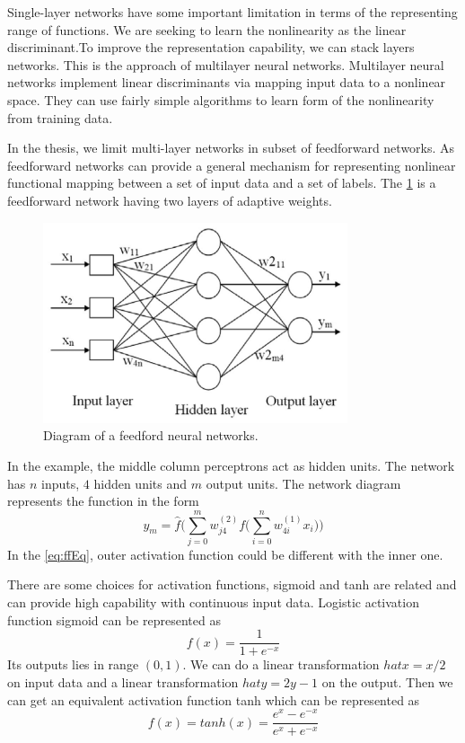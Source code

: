 Single-layer networks have some important limitation in terms of the representing range of functions. We are seeking to learn the nonlinearity as the linear discriminant.To improve the representation capability, we can stack layers networks. This is the approach of multilayer neural networks. Multilayer neural networks implement linear discriminants via mapping input data to a nonlinear space. They can use fairly simple algorithms to learn form of the nonlinearity from training data.

In the thesis, we limit multi-layer networks in subset of feedforward networks. As feedforward networks can provide a general mechanism for representing nonlinear functional mapping between a set of input data and a set of labels. The \ref{fig:ffnet} is a feedforward network having two layers of adaptive weights.

\begin{figure}[!htb]
\centering
\includegraphics[width=0.8\textwidth]{Figure2-2.png}
\caption{\label{fig:ffnet}Diagram of a feedford neural networks.}
\end{figure}

In the example, the middle column perceptrons act as hidden units. The network has $n$ inputs, $4$ hidden units and $m$ output units. The network diagram represents the function in the form
\begin{equation}\label{eq:ffEq}
y_{m} = \hat{f}\Big(\sum_{j=0}^{m}w_{j4}^{(2)}f\big(\sum_{i=0}^{n}w_{4i}^{(1)}x_{i}\big)\Big)
\end{equation}
In the \ref{eq:ffEq}, outer activation function could be different with the inner one.

There are some choices for activation functions, sigmoid and tanh are related and can provide high capability with continuous input data. Logistic activation function sigmoid can be represented as 
\begin{equation}\label{eq:sigmoid}
f(x) = \frac{1}{1+e^{-x}}
\end{equation}
Its outputs lies in range $(0,1)$. We can do a linear transformation $hat{x}=x/2$ on input data and a linear transformation $hat{y}=2y-1$ on the output. Then we can get an equivalent activation function tanh which can be represented as
\begin{equation}\label{eq:tanh}
f(x) = tanh(x) = \frac{e^{x}-e^{-x}}{e^{x}+e^{-x}}
\end{equation}


